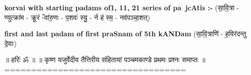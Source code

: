 \documentclass[17pt]{extarticle}
\begin{document}
        \textbf{korvai with starting padams of1, 11, 21 series of pa~jcAtis :-} \newline
        (सा॒वि॒त्रा - ण्युत्क्रा॑म - क्रू॒रं -ॅवा॑रु॒णः - प॒शवः॑ स्यु॒ - र्न ह॑ स्म॒ - नव॑पञ्चा॒शत्) \newline

        \textbf{first and last padam of first praSnam of 5th kANDam} \newline
        (सा॒वि॒त्राणि॑ - ह॒विर॑दन्तु दे॒वाः) \newline 

        
        ॥ हरिः॑ ॐ ॥
॥ कृष्ण यजुर्वेदीय तैत्तिरीय संहितायां पञ्चमकाण्डे प्रथमः प्रश्नः समाप्तः ॥
================================== \newline
        \pagebreak
                \pagebreak
        
\end{document}
